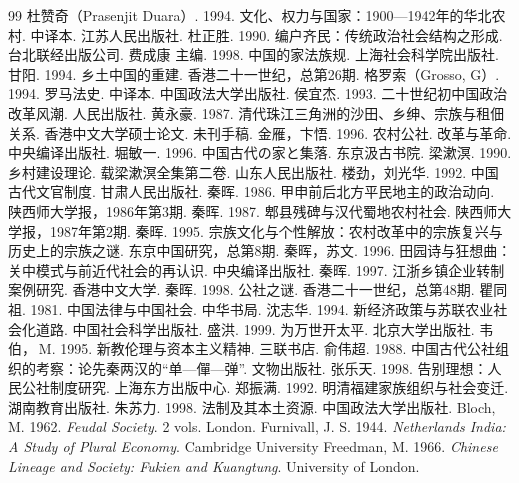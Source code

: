 \documentclass[a4paper,12pt,punct=kaiming]{ctexart}
\begin{document}
\begin{thebibliography}{99}
 杜赞奇（Prasenjit Duara）. 1994. 文化、权力与国家：1900—1942年的华北农村. 中译本. 江苏人民出版社.
 杜正胜. 1990. 编户齐民：传统政治社会结构之形成. 台北联经出版公司.
 费成康 主编. 1998. 中国的家法族规. 上海社会科学院出版社.
 甘阳. 1994. 乡土中国的重建. 香港二十一世纪，总第26期.
 格罗索（Grosso, G）. 1994. 罗马法史. 中译本. 中国政法大学出版社.
 侯宜杰. 1993. 二十世纪初中国政治改革风潮. 人民出版社.
 黄永豪. 1987. 清代珠江三角洲的沙田、乡绅、宗族与租佃关系. 香港中文大学硕士论文. 未刊手稿.
 金雁，卞悟. 1996. 农村公社. 改革与革命. 中央编译出版社.
 堀敏一. 1996. 中国古代の家と集落. 东京汲古书院.
 梁漱溟. 1990. 乡村建设理论. 载梁漱溟全集第二卷. 山东人民出版社.
 楼劲，刘光华. 1992. 中国古代文官制度. 甘肃人民出版社.
 秦晖. 1986. 甲申前后北方平民地主的政治动向. 陕西师大学报，1986年第3期.
 秦晖. 1987. 郫县残碑与汉代蜀地农村社会. 陕西师大学报，1987年第2期.
 秦晖. 1995. 宗族文化与个性解放：农村改革中的宗族复兴与历史上的宗族之谜. 东京中国研究，总第8期.
 秦晖，苏文. 1996. 田园诗与狂想曲：关中模式与前近代社会的再认识. 中央编译出版社.
 秦晖. 1997. 江浙乡镇企业转制案例研究. 香港中文大学.
 秦晖. 1998. 公社之谜. 香港二十一世纪，总第48期.
 瞿同祖. 1981. 中国法律与中国社会. 中华书局.
 沈志华. 1994. 新经济政策与苏联农业社会化道路. 中国社会科学出版社.
 盛洪. 1999. 为万世开太平. 北京大学出版社.
 韦伯， M. 1995. 新教伦理与资本主义精神. 三联书店.
 俞伟超. 1988. 中国古代公社组织的考察：论先秦两汉的“单—僤—弹”. 文物出版社.
 张乐天. 1998. 告别理想：人民公社制度研究. 上海东方出版中心.
 郑振满. 1992. 明清福建家族组织与社会变迁. 湖南教育出版社.
 朱苏力. 1998. 法制及其本土资源. 中国政法大学出版社.
 Bloch, M. 1962. \textit{Feudal Society}. 2 vols. London.
 Furnivall, J. S. 1944. \textit{Netherlands India: A Study of Plural Economy}. Cambridge University
 Freedman, M. 1966. \textit{Chinese Lineage and Society: Fukien and Kuangtung}. University of London.

\end{thebibliography}
\end{document}
